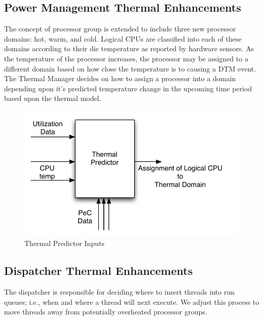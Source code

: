 \documentclass[]{sig-alternate-hotpower09}
\begin{document}
\subsection{Power Management Thermal Enhancements}
\label{sec:thenhance}
The concept of processor group is extended to include three new
processor domains: hot, warm, and cold.   Logical CPUs are classified
into each of these domains according to their die temperature as
reported by hardware sensors.   As the temperature of the processor
increases, the processor may be assigned to a different domain based on
how close the temperature is to causing a DTM event.  The Thermal
Manager decides on how to assign a processor into a domain depending
upon it's predicted temperature change in the upcoming time period
based upon the thermal model.
\begin{figure}[htbp]
  \centering
  \includegraphics[scale=0.40]{thermalpredictor.pdf}
  \caption{Thermal Predictor Inputs}
  \label{fig:predictor}
\end{figure}
\subsection{Dispatcher Thermal Enhancements}
\label{sec:dispenchance}
The dispatcher is responsible for deciding where to insert threads into
run queues; i.e., when and where a thread will next execute.  We adjust
this process to move threads away from potentially overheated processor
groups.  
\end{document}
